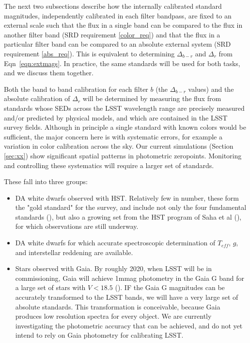 \documentclass[12pt,preprint]{aastex}
\begin{document}
The next two subsections describe how the internally calibrated
standard magnitudes, independently calibrated in each filter bandpass, are fixed
to an external scale such that the flux in a single band can be compared to the
flux in another filter band (SRD requirement \ref{color_req}) and that
the flux in a particular filter band can be compared to an absolute
external system (SRD requirement \ref{abs_req}). This is equivalent to
determining $\Delta_{b-r}$ and $\Delta_r$ from Eqn~\ref{eqn:extmags}. In practice, the same 
standards will be used for both tasks, and we discuss them together.

Both the band to band calibration for each filter $b$ (the $\Delta_{b-r}$
values) and the absolute calibration of $\Delta_r$ will be determined by measuring the flux from standards
whose SEDs across the LSST wavelength range are precisely measured and/or
predicted by physical models, and which are contained in the LSST
survey fields.
Although in principle a single standard with known colors would be
sufficient, the major concern here is with systematic errors, for
example a variation in color calibration across the sky.  Our current simulations (Section \ref{sec:xx})
show significant spatial patterns in photometric zeropoints.  Monitoring
and controlling these
systematics will require a larger set of standards.

These fall into three groups:
\begin{itemize}
\item {DA white dwarfs observed with HST.  Relatively few in number, these form the "gold standard" for the survey,
and include not only the four fundamental standards (\citep{BohlinGilliland}), but also a growing set from
the HST program of Saha et al (\citep{AbiProposal}), for which observations are still underway.}
\item {DA white dwarfs for which accurate spectroscopic determination of $T_{eff}$, $g$, and interstellar
reddening are available.}
\item {Stars observed with Gaia.  By roughly 2020, when LSST will be in commissioning, 
Gaia will achieve 1mmag photometry in the Gaia G band 
for a large set of stars with $V < 18.5$ (\citep{Jordi2010}).  IF the Gaia G magnitudes can be accurately
transformed to the LSST bands, we will have a very large set of absolute standards.  This transformation 
is conceivable, because Gaia produces low resolution spectra for every object.  We are currently
investigating the photometric accuracy that can be achieved, and do not yet intend to rely on Gaia
photometry for calibrating LSST.}
\end{itemize}
\end{document}
